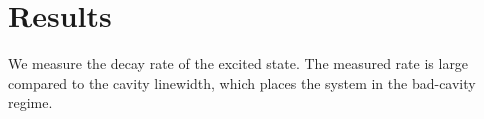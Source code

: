 \documentclass{article}
\begin{document}
\section{Results}
We measure the decay rate of the excited state.
The measured rate is large compared to the cavity linewidth, which places the system in the bad-cavity regime.
\end{document}
